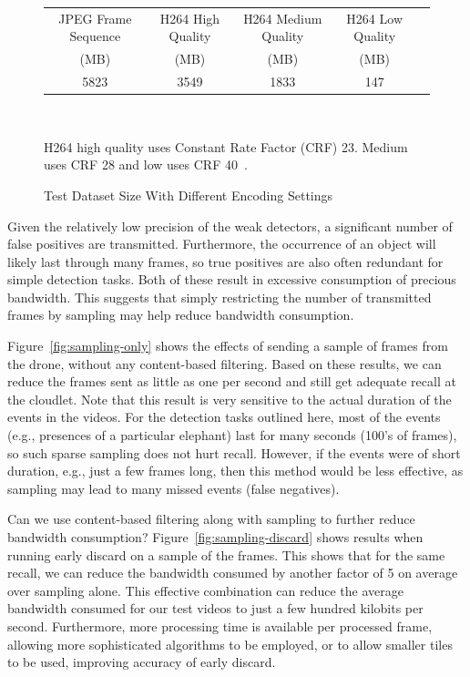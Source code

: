 \begin{figure}[h]
\centering
\begin{tabular}{|c|c|c|c|c|}
\hline
JPEG Frame Sequence  & H264 High Quality  & H264 Medium Quality & H264 Low Quality \\
(MB) & (MB) & (MB) & (MB)\\
\hline
5823 & 3549  & 1833 & 147\\
\hline
\end{tabular}\\
\vspace{0.1in}
\begin{captiontext}
H264 high quality uses Constant Rate Factor (CRF) 23. Medium
uses CRF 28 and low uses CRF 40~\cite{Merritt2007}.
\end{captiontext}
\caption{Test Dataset Size With Different Encoding Settings}
\label{fig:video-vs-images}
\end{figure}

Given the relatively low precision of the weak detectors, a significant number 
of false positives are transmitted.  Furthermore, the occurrence of an object will
likely last through many frames, so true positives are also often redundant for 
simple detection tasks.  Both of these result in excessive
consumption of precious bandwidth.  
This suggests that simply restricting the number of transmitted
frames by sampling may help reduce bandwidth consumption.  

Figure~\ref{fig:sampling-only} shows the effects of 
sending a sample of frames from the drone, without any
content-based filtering.  Based on these results, we can reduce
the frames sent as little as one per second and still get
adequate recall at the cloudlet.  Note that this result is very
sensitive to the actual duration of the events in the videos.
For the detection tasks outlined here, most of the events (e.g.,
presences of a particular elephant) last for many seconds (100's
of frames), so such sparse sampling does not hurt recall.
However, if the events were of short duration, e.g., just a few
frames long, then this method would be less effective, as
sampling may lead to many missed events (false negatives).  

Can we use content-based filtering along with sampling to further
reduce bandwidth consumption?  Figure~\ref{fig:sampling-discard}
shows results when running early discard on a sample of the
frames. This shows that for the same recall, we can reduce the
bandwidth consumed by another factor of 5 on average over sampling alone.
This effective combination can reduce the average bandwidth
consumed for our test videos to just a few hundred kilobits
per second.  Furthermore, more processing time is available per
processed frame, allowing more sophisticated algorithms to be
employed, or to allow smaller tiles to be used, improving
accuracy of early discard.  

